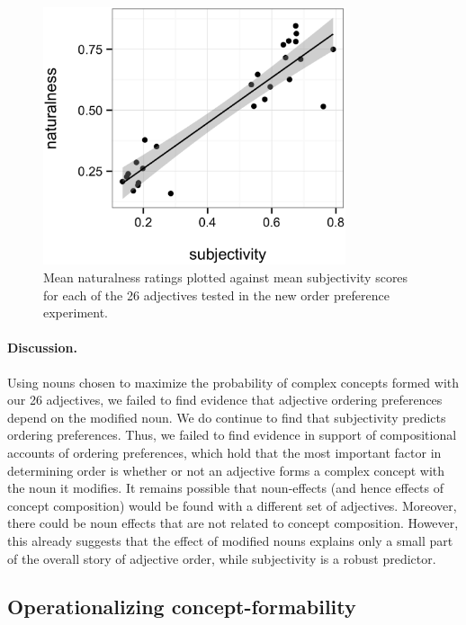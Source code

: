 \documentclass[12pt]{article}
\newcommand{\jd}[1]{\textcolor{red}{[jd: #1]}}
\begin{document}
\renewcommand\thefigure{S.\arabic{figure}}
\begin{figure}
	\centering\includegraphics[width=3.5in]{plots/naturalness-subjectivity-new-nouns.eps}
	\caption{Mean naturalness ratings plotted against mean subjectivity scores for each of the 26 adjectives tested in the new order preference experiment.}\label{fig:subjectivity}
\end{figure}

\paragraph{Discussion.} Using nouns chosen to maximize the probability of complex concepts formed with our 26 adjectives, we failed to find evidence that adjective ordering preferences depend on the modified noun. We do continue to find that subjectivity predicts ordering preferences. Thus, we failed to find evidence in support of compositional accounts of ordering preferences, which hold that the most important factor in determining order is whether or not an adjective forms a complex concept with the noun it modifies. 
It remains possible that noun-effects (and hence effects of concept composition)  %
would be found with a different set of adjectives. Moreover, there could be noun effects that are not related to concept composition. 
However, this already suggests that the effect of modified nouns explains only a small part of the overall story of adjective order, while subjectivity is a robust predictor.



\subsection{Operationalizing concept-formability} \label{operationalize}
\end{document}
